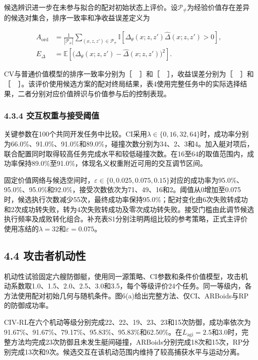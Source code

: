 \documentclass[UTF8,a4paper,zihao=5,fontset=none]{ctexart}
\begin{document}
候选辨识进一步在未参与拟合的配对初始状态上评价。设\(\mathcal P_{\ne}\)为经验价值存在差异的候选对集合，排序一致率和净收益误差定义为

\[
\begin{aligned}
A_{\mathrm{ord}}
&=\frac1{|\mathcal P_{\ne}|}
\sum_{(x,z,z')\in\mathcal P_{\ne}}
\mathbb I\!\left[\Delta_\theta(x;z,z')\widehat\Delta(x;z,z')>0\right],\\
E_\Delta&=\mathbb E\!\left[
\bigl(\Delta_\theta(x;z,z')-\widehat\Delta(x;z,z')\bigr)^2\right].
\end{aligned}
\tag{41}
\]

CV与普通价值模型的排序一致率分别为［　］和［　］，收益误差分别为［　］和［　］。该评价使用候选方案的配对终局结果，表4使用完整任务中的实际选择结果，二者分别对应价值辨识与价值参与后的控制表现。

\subsubsection*{4.3.4
交互权重与接受阈值}

关键参数在100个共同开发任务中比较。CI采用\(\lambda\in\{0,16,32,64\}\)时，成功率分别为66.0\%、91.0\%、91.0\%和89.0\%，碰撞次数分别为34、2、3和4。加入艇对项后，联合配置同时取得较高任务完成水平和较低碰撞次数。在16至64的取值范围内，成功率保持89.0\%至91.0\%，体现名义权重附近可用的交互调节区间。

固定价值网络与候选空间时，\(\varepsilon\in\{0,0.025,0.075,0.15\}\)对应的成功率为95.0\%、95.0\%、95.0\%和92.0\%，接受次数依次为71、49、16和2。阈值从0增加至0.075时，候选执行次数减少55次，最终成功率保持95.0\%；配对变化由6次失败转成功和2次成功转失败，转为4次失败转成功及零次成功转失败。接受门槛由此调节候选执行频率及成败转化组合。补充表S1分别注明两组比较的参考策略，正式主评价使用冻结的\(\lambda=32\)和\(\varepsilon=0.075\)。

\subsection*{4.4
攻击者机动性}

机动性试验固定六艘防御艇，使用同一源策略、CI参数和条件价值模型，攻击机动系数取1.0、1.5、2.0、2.5、3.0和3.5，每个等级评价24个任务。同一等级内，各方法使用配对初始几何与随机条件。图6(a)给出完整方法、仅CI、ARBoids与RP的防御成功率。

CIV-RL在六个机动等级分别完成22、22、19、23、23和15次防御，成功率依次为91.67\%、91.67\%、79.17\%、95.83\%、95.83\%和62.50\%。在\(L_{\mathrm{agi}}=2.5\)和3.0时，完整方法均完成23次防御且未发生艇间碰撞，ARBoids分别完成18次和15次，RP分别完成13次和9次。候选交互在该机动范围内维持了较高捕获水平与运动分离。
\end{document}

